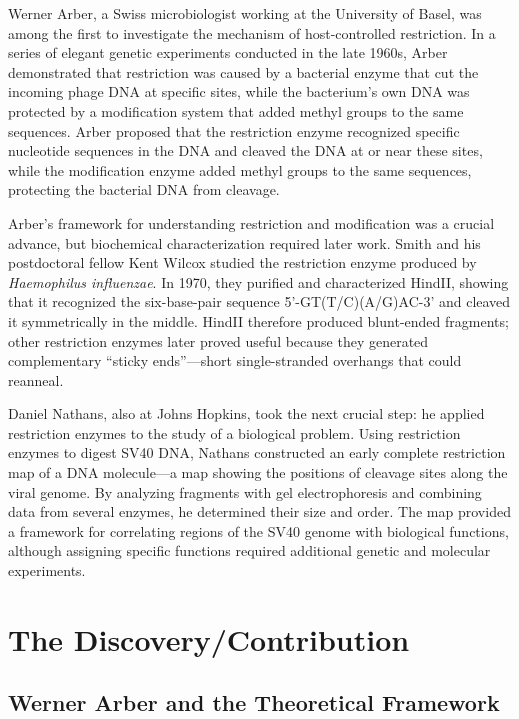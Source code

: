 Werner Arber, a Swiss microbiologist working at the University of Basel, was among the first to investigate the mechanism of host-controlled restriction. In a series of elegant genetic experiments conducted in the late 1960s, Arber demonstrated that restriction was caused by a bacterial enzyme that cut the incoming phage DNA at specific sites, while the bacterium's own DNA was protected by a modification system that added methyl groups to the same sequences. Arber proposed that the restriction enzyme recognized specific nucleotide sequences in the DNA and cleaved the DNA at or near these sites, while the modification enzyme added methyl groups to the same sequences, protecting the bacterial DNA from cleavage.

Arber's framework for understanding restriction and modification was a crucial advance, but biochemical characterization required later work. Smith and his postdoctoral fellow Kent Wilcox studied the restriction enzyme produced by \emph{Haemophilus influenzae}. In 1970, they purified and characterized HindII, showing that it recognized the six-base-pair sequence 5'-GT(T/C)(A/G)AC-3' and cleaved it symmetrically in the middle. HindII therefore produced blunt-ended fragments; other restriction enzymes later proved useful because they generated complementary ``sticky ends''---short single-stranded overhangs that could reanneal.

Daniel Nathans, also at Johns Hopkins, took the next crucial step: he applied restriction enzymes to the study of a biological problem. Using restriction enzymes to digest SV40 DNA, Nathans constructed an early complete restriction map of a DNA molecule---a map showing the positions of cleavage sites along the viral genome. By analyzing fragments with gel electrophoresis and combining data from several enzymes, he determined their size and order. The map provided a framework for correlating regions of the SV40 genome with biological functions, although assigning specific functions required additional genetic and molecular experiments.

\section{The Discovery/Contribution}

\subsection{Werner Arber and the Theoretical Framework}

